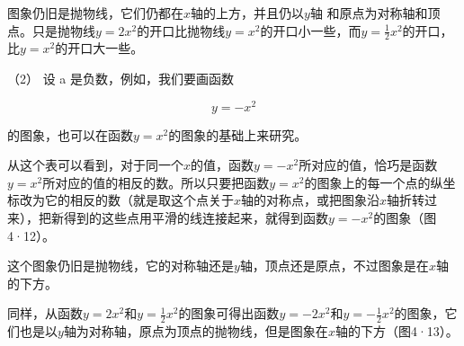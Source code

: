 图象仍旧是抛物线，它们仍都在\(x\)轴的上方，并且仍以\(y\)轴
和原点为对称轴和顶点。只是抛物线\(y = 2x^{2}\)的开口比抛物线\(y = x^{2}\)的开口小一些，而\(y = \frac{1}{2} x^{2}\)的开口，比\(y = x^{2}\)的开口大一些。

（2） 设 a 是负数，例如，我们要画函数

\[
y = - x^{2}
\]

的图象，也可以在函数\(y=x^{2}\)的图象的基础上来研究。

{\centering
\footnotesize\setlength{\tabcolsep}{2.6pt}%
\par
}

从这个表可以看到，对于同一个\(x\)的值，函数\(y = -x^2\)所对应的值，恰巧是函数\(y = x^2\)所对应的值的相反的数。所以只要把函数\(y = x^2\)的图象上的每一个点的纵坐标改为它的相反的数（就是取这个点关于\(x\)轴的对称点，或把图象沿\(x\)轴折转过来），把新得到的这些点用平滑的线连接起来，就得到函数\(y = -x^2\)的图象（图4·12）。

这个图象仍旧是抛物线，它的对称轴还是\(y\)轴，顶点还是原点，不过图象是在\(x\)轴的下方。

同样，从函数\(y = 2x^2\)和\(y = \frac{1}{2} x^2\)的图象可得出函数\(y = -2x^2\)和\(y = -\frac{1}{2} x^2\)的图象，它们也是以\(y\)轴为对称轴，原点为顶点的抛物线，但是图象在\(x\)轴的下方（图4·13）。

